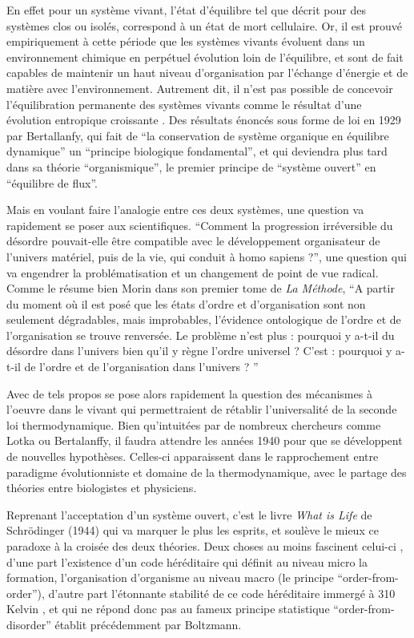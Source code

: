 En effet pour un système vivant, l'état d'équilibre tel que décrit pour des systèmes clos ou isolés, correspond à un état de mort cellulaire. Or, il est prouvé empiriquement à cette période que les systèmes vivants évoluent dans un environnement chimique en perpétuel évolution loin de l'équilibre, et sont de fait capables de maintenir un haut niveau d'organisation par l'échange d'énergie et de matière avec l'environnement. Autrement dit, il n'est pas possible de concevoir l'équilibration permanente des systèmes vivants comme le résultat d'une évolution entropique croissante \autocite[248]{Lemoigne1977}. Des résultats énoncés sous forme de loi en 1929 par Bertallanfy, qui fait de \enquote{la conservation de système organique en équilibre dynamique} un \enquote{principe biologique fondamental}, et qui deviendra plus tard dans sa théorie \enquote{organismique}, le premier principe de  \enquote{système ouvert} en \enquote{équilibre de flux}. \autocite[492]{Pouvreau2013}

Mais en voulant faire l'analogie entre ces deux systèmes, une question va rapidement se poser aux scientifiques. \enquote{Comment la progression irréversible du désordre pouvait-elle être compatible avec le développement organisateur de l'univers matériel, puis de la vie, qui conduit à homo sapiens ?}, une question qui va engendrer la problématisation et un changement de point de vue radical. Comme le résume bien Morin dans son premier tome de \textit{La Méthode}, \enquote{A partir du moment où il est posé que les états d'ordre et d'organisation sont non seulement dégradables, mais improbables, l'évidence ontologique de l'ordre et de l'organisation se trouve renversée. Le problème n'est plus : pourquoi y a-t-il du désordre dans l'univers bien qu'il y règne l'ordre universel ? C'est : pourquoi y a-t-il de l'ordre et de l'organisation dans l'univers ? } \autocite[37]{Morin1977}

Avec de tels propos se pose alors rapidement la question des mécanismes à l'oeuvre dans le vivant qui permettraient de rétablir l'universalité de la seconde loi thermodynamique. Bien qu'intuitées par de nombreux chercheurs comme Lotka ou Bertalanffy, il faudra attendre les années 1940 pour que se développent de nouvelles hypothèses. Celles-ci apparaissent dans le rapprochement entre paradigme évolutionniste et domaine de la thermodynamique, avec le partage des théories entre biologistes et physiciens.

Reprenant l'acceptation d'un système ouvert, c'est le livre \textit{What is Life} de Schrödinger (1944) qui va marquer le plus les esprits, et soulève le mieux ce paradoxe à la croisée des deux théories. Deux choses au moins fascinent celui-ci \autocite{Foerster1959}, d'une part l'existence d'un code héréditaire qui définit au niveau micro la formation, l'organisation d'organisme au niveau macro (le principe \enquote{order-from-order}), d'autre part l'étonnante stabilité de ce code héréditaire immergé à 310 Kelvin \autocite[47]{Schrodinger1944}, et qui ne répond donc pas au fameux principe statistique \enquote{order-from-disorder} établit précédemment par Boltzmann.

